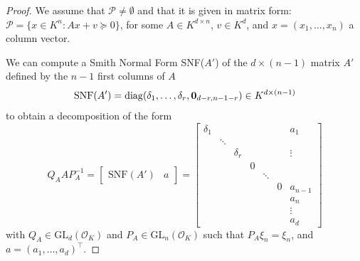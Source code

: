 \documentclass{elsarticle}
\theoremstyle{plain}
\theoremstyle{definition}
\newcommand{\PP}{\mathcal{P}}
\newcommand{\OK}{\mathcal{O}_K}
\def\diag{\mathrm{diag}}
\newcommand{\GL}{\mathrm{GL}}
\begin{document}
\begin{proof}
  We assume that $\PP \neq \emptyset$ and that it is given in
  matrix form: $\PP = \{x \in K^n : Ax+v \succeq 0\}$, for some 
  $A \in K^{d \times n}$, $v \in K^d$,
  and $x=(x_1,\dots,x_n)$ a column vector. 

  We can compute a Smith Normal Form SNF($A'$)
  of the $d \times (n-1)$ matrix $A'$ defined by the 
  $n-1$ first columns of $A$
  \[
\mathrm{SNF}(A') = \diag(\delta_1,\ldots,\delta_r,{\bf 0}_{d-r,n-1-r}) \in K^{d \times (n-1)}
\]
to obtain a decomposition of the form
\[
Q_A A P_A^{-1} =
\begin{bmatrix}
 \mathrm{SNF}(A') & a
\end{bmatrix}
=
\left[
\begin{smallmatrix}
\delta_1 &        &          &   &        &   & a_1     \\[-.25cm]
         & \ddots &          &   &        &   &         \\[-.35cm]
         &	  & \delta_r &   &        &   &  \vdots \\
         &	  &          & 0 &        &   &         \\[-.25cm]
         &	  &          &   & \ddots &   &         \\
         &	  &          &   &	  & 0 & a_{n-1} \\ 
         &	  &          &   &	  &   & a_n 	\\
         &	  &          &   &	  &   & \vdots 	\\
         &	  &          &   &	  &   & a_d 	
\end{smallmatrix}
\right]
\]
with $Q_A \in \GL_d(\OK)$ and $P_A \in \GL_n(\OK)$ such that $P_A \xi_n = \xi_n$,
and $a = (a_1,\ldots,a_d)^\intercal$.


\end{proof}
\end{document}

